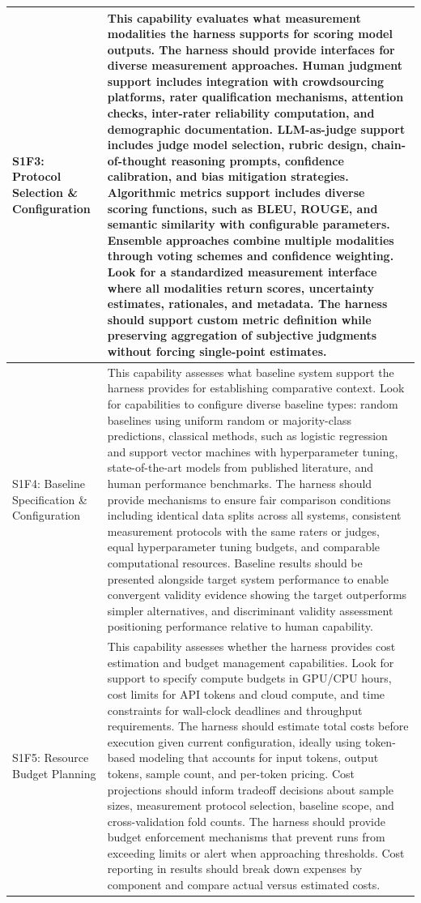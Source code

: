 \begin{longtable}{>{\raggedright\arraybackslash}p{3cm}|>{\raggedright\arraybackslash}p{16cm}}
S1F3: Protocol Selection \& Configuration & This capability evaluates what measurement modalities the harness supports for scoring model outputs. The harness should provide interfaces for diverse measurement approaches. Human judgment support includes integration with crowdsourcing platforms, rater qualification mechanisms, attention checks, inter-rater reliability computation, and demographic documentation. LLM-as-judge support includes judge model selection, rubric design, chain-of-thought reasoning prompts, confidence calibration, and bias mitigation strategies. Algorithmic metrics support includes diverse scoring functions, such as BLEU, ROUGE, and semantic similarity with configurable parameters. Ensemble approaches combine multiple modalities through voting schemes and confidence weighting. Look for a standardized measurement interface where all modalities return scores, uncertainty estimates, rationales, and metadata. The harness should support custom metric definition while preserving aggregation of subjective judgments without forcing single-point estimates. \\
\hline

S1F4: Baseline Specification \& Configuration & This capability assesses what baseline system support the harness provides for establishing comparative context. Look for capabilities to configure diverse baseline types: random baselines using uniform random or majority-class predictions, classical methods, such as logistic regression and support vector machines with hyperparameter tuning, state-of-the-art models from published literature, and human performance benchmarks. The harness should provide mechanisms to ensure fair comparison conditions including identical data splits across all systems, consistent measurement protocols with the same raters or judges, equal hyperparameter tuning budgets, and comparable computational resources. Baseline results should be presented alongside target system performance to enable convergent validity evidence showing the target outperforms simpler alternatives, and discriminant validity assessment positioning performance relative to human capability. \\
\hline

S1F5: Resource Budget Planning & This capability assesses whether the harness provides cost estimation and budget management capabilities. Look for support to specify compute budgets in GPU/CPU hours, cost limits for API tokens and cloud compute, and time constraints for wall-clock deadlines and throughput requirements. The harness should estimate total costs before execution given current configuration, ideally using token-based modeling that accounts for input tokens, output tokens, sample count, and per-token pricing. Cost projections should inform tradeoff decisions about sample sizes, measurement protocol selection, baseline scope, and cross-validation fold counts. The harness should provide budget enforcement mechanisms that prevent runs from exceeding limits or alert when approaching thresholds. Cost reporting in results should break down expenses by component and compare actual versus estimated costs. \\
\hline


\end{longtable}
